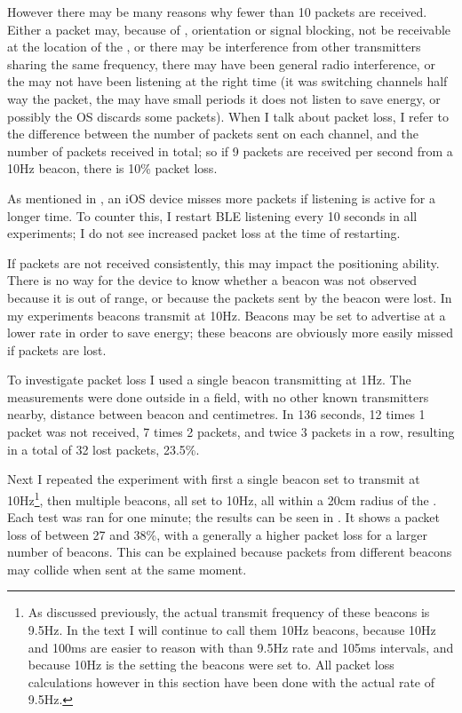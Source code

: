 However there may be many reasons why fewer than 10 packets are received.
Either a packet may, because of \mpi, orientation or signal blocking, not be receivable at the location of the \device, or there may be interference from other transmitters sharing the same frequency, there may have been general radio interference, or the \device may not have been listening at the right time (it was switching channels half way the packet, the \device may have small periods it does not listen to save energy, or possibly the OS discards some packets).
When I talk about packet loss, I refer to the difference between the number of packets sent on each channel, and the number of packets received in total; so if 9 packets are received per second from a 10Hz beacon, there is 10\% packet loss.

As mentioned in , an iOS device misses more packets if \BLE listening is active for a longer time.
To counter this, I restart BLE listening every 10 seconds in all experiments; I do not see increased packet loss at the time of restarting.

If packets are not received consistently, this may impact the positioning ability.
There is no way for the device to know whether a beacon was not observed because it is out of range, or because the packets sent by the beacon were lost.
In my experiments beacons transmit at 10Hz.
Beacons may be set to advertise at a lower rate in order to save energy; these beacons are obviously more easily missed if packets are lost.

To investigate packet loss I used a single beacon transmitting at 1Hz.
The measurements were done outside in a field, with no other known transmitters nearby, distance between beacon and  centimetres.
In 136 seconds, 12 times 1 packet was not received, 7 times 2 packets, and twice 3 packets in a row, resulting in a total of 32 lost packets, 23.5\%.

Next I repeated the experiment with first a single beacon set to transmit at 10Hz\footnote{As discussed previously, the actual transmit frequency of these beacons is 9.5Hz. In the text I will continue to call them 10Hz beacons, because 10Hz and 100ms are easier to reason with than 9.5Hz rate and 105ms intervals, and because 10Hz is the setting the beacons were set to. All packet loss calculations however in this section have been done with the actual rate of 9.5Hz.}, then multiple beacons, all set to 10Hz, all within a 20cm radius of the \device.
Each test was ran for one minute; the results can be seen in .
It shows a packet loss of between 27 and 38\%, with a generally a higher packet loss for a larger number of beacons.
This can be explained because packets from different beacons may collide when sent at the same moment.

